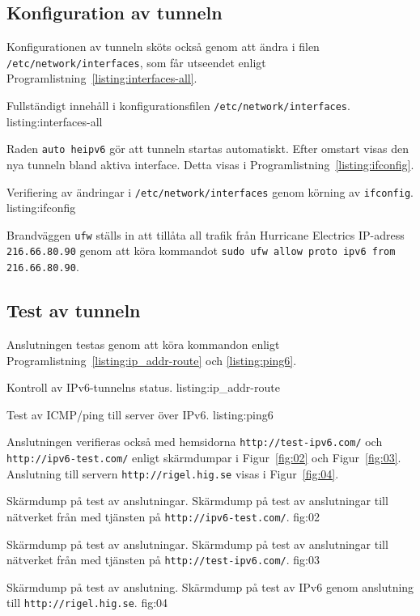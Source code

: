 \subsection{Konfiguration av tunneln}
Konfigurationen av tunneln sköts också genom att ändra i filen
\texttt{/etc/network/interfaces}, som får utseendet enligt
Programlistning~\ref{listing:interfaces-all}.

            {Fullständigt innehåll i konfigurationsfilen \texttt{/etc/network/interfaces}.}
            {listing:interfaces-all}


Raden \texttt{auto heipv6} gör att tunneln startas automatiskt.
Efter omstart visas den nya tunneln bland aktiva interface. Detta visas i  
Programlistning~\ref{listing:ifconfig}.

            {Verifiering av ändringar i \texttt{/etc/network/interfaces}
             genom körning av \texttt{ifconfig}.}
            {listing:ifconfig}

Brandväggen \texttt{ufw} ställs in att tillåta all trafik från Hurricane
Electrics IP-adress \texttt{216.66.80.90} genom att köra kommandot \texttt{sudo
ufw allow proto ipv6 from 216.66.80.90}.

\subsection{Test av tunneln}
Anslutningen testas genom att köra kommandon enligt 
Programlistning~\ref{listing:ip_addr-route} och \ref{listing:ping6}.

            {Kontroll av IPv6-tunnelns status.}
            {listing:ip_addr-route}

            {Test av ICMP/ping till server över IPv6.}
            {listing:ping6}

Anslutningen verifieras också med hemsidorna \texttt{http://test-ipv6.com/}
och \texttt{http://ipv6-test.com/} enligt skärmdumpar i Figur~\ref{fig:02}
och Figur~\ref{fig:03}.
Anslutning till servern \texttt{http://rigel.hig.se} visas i
Figur~\ref{fig:04}.

           {Skärmdump på test av anslutningar.}
           {Skärmdump på test av anslutningar till nätverket från med tjänsten
            på \texttt{http://ipv6-test.com/}.}
           {fig:02}

           {Skärmdump på test av anslutningar.}
           {Skärmdump på test av anslutningar till nätverket från med tjänsten
            på \texttt{http://test-ipv6.com/}.}
           {fig:03}

           {Skärmdump på test av anslutning.}
           {Skärmdump på test av IPv6 genom anslutning till
            \texttt{http://rigel.hig.se}.}
           {fig:04}


